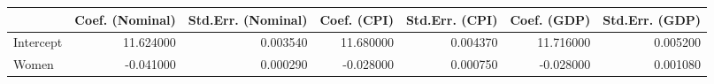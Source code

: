 \begin{tabular}{lrrrrrr}
\toprule
 & Coef. (Nominal) & Std.Err. (Nominal) & Coef. (CPI) & Std.Err. (CPI) & Coef. (GDP) & Std.Err. (GDP) \\
\midrule
Intercept & 11.624000 & 0.003540 & 11.680000 & 0.004370 & 11.716000 & 0.005200 \\
Women & -0.041000 & 0.000290 & -0.028000 & 0.000750 & -0.028000 & 0.001080 \\
\bottomrule
\end{tabular}
